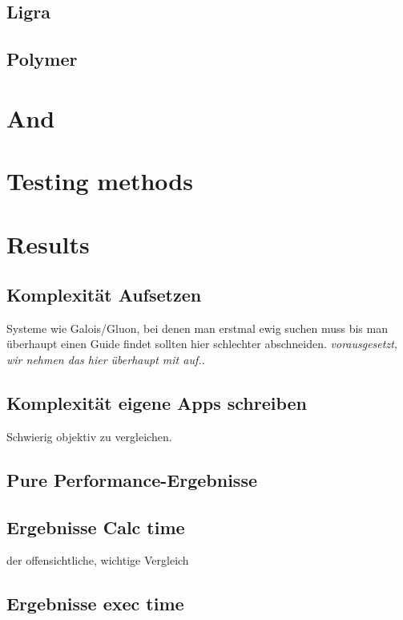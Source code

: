 \documentclass[conference,a4paper]{IEEEtran}
\begin{document}
\subsection{Ligra}


\subsection{Polymer}



\section{And}

\section{Testing methods}


\section{Results}
\subsection{Komplexität Aufsetzen}
Systeme wie Galois/Gluon, bei denen man erstmal ewig suchen muss bis man überhaupt einen Guide findet sollten hier schlechter abschneiden. \emph{vorausgesetzt, wir nehmen das hier überhaupt mit auf..}

\subsection{Komplexität eigene Apps schreiben}
Schwierig objektiv zu vergleichen.


\subsection{Pure Performance-Ergebnisse}

\subsection{Ergebnisse Calc time}
der offensichtliche, wichtige Vergleich

\subsection{Ergebnisse exec time}
\end{document}
